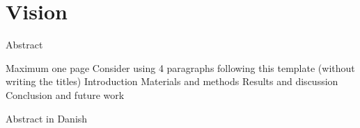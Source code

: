 \documentclass[../main.tex]{subfiles}
\begin{document}
\section{Vision}

Abstract

Maximum one page
Consider using 4 paragraphs following this template (without writing the titles)
    Introduction
    Materials and methods
    Results and discussion
    Conclusion and future work

Abstract in Danish
\end{document}
